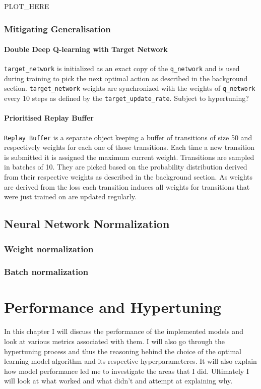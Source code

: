 PLOT\_HERE

\subsection{Mitigating Generalisation}
\subsubsection{Double Deep Q-learning with Target Network}
\texttt{target\_network} is initialized as an exact copy of the 
\texttt{q\_network} and is used during training to pick the next 
optimal action as described in the background section. 
\texttt{target\_network} weights are synchronized with the
weights of \texttt{q\_network} every 10 steps as defined by the 
\texttt{target\_update\_rate}. Subject to hypertuning?

\subsubsection{Prioritised Replay Buffer}
\texttt{Replay Buffer} is a separate object keeping a buffer
of transitions of size 50 and respectively weights for each one 
of those transitions. Each time a new transition is submitted
it is assigned the maximum current weight. Transitions are 
sampled in batches of 10. They are picked based on the 
probability distribution derived from their respective weights
as described in the background section. As weights are derived 
from the loss each transition induces all weights for 
transitions that were just trained on are updated regularly. 

\section{Neural Network Normalization}
\subsection{Weight normalization}



\subsection{Batch normalization}

\chapter{Performance and Hypertuning}
In this chapter I will discuss the performance of 
the implemented models and look at various metrics
associated with them. I will also go through the
hypertuning process and thus the reasoning behind the
choice of the optimal learning model algorithm and its
respective hyperparameteres.
It will also explain how model performance led me to 
investigate the areas that I did. Ultimately I will look at
what worked and what didn't and attempt at explaining why.


